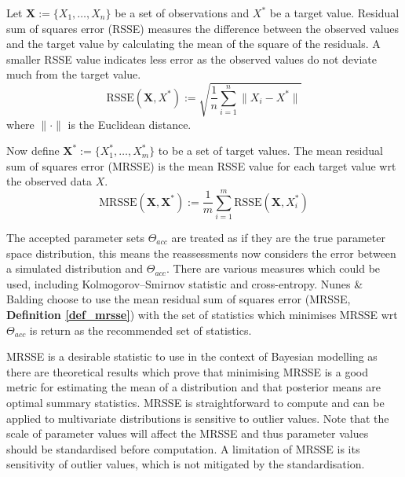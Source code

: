 \documentclass[11pt,a4paper]{article}
\theoremstyle{break}
\begin{document}
  \begin{box_definition}\label{def_mrsse}
    Let $\mathbf{X}:=\{X_1,\dots,X_n\}$ be a set of observations and $X^*$ be a target value. Residual sum of squares error (RSSE) measures the difference between the observed values and the target value by calculating the mean of the square of the residuals. A smaller RSSE value indicates less error as the observed values do not deviate much from the target value.
    \[ \text{RSSE}(\mathbf{X},X^*):=\sqrt{\frac1n\sum_{i=1}^n\|X_i-X^*\|} \]
    where $\|\cdot\|$ is the Euclidean distance.
    \par Now define $\mathbf{X}^*:=\{X_1^*,\dots,X_m^*\}$ to be a set of target values. The mean residual sum of squares error (MRSSE) is the mean RSSE value for each target value wrt the observed data $X$.
    \[ \text{MRSSE}(\mathbf{X},\mathbf{X}^*):=\frac1m\sum_{i=1}^m\text{RSSE}(\mathbf{X},X_i^*) \]
  \end{box_definition}

  \par The accepted parameter sets $\Theta_{acc}$ are treated as if they are the true parameter space distribution, this means the reassessments now considers the error between a simulated distribution and $\Theta_{acc}$. There are various measures which could be used, including Kolmogorov–Smirnov statistic \cite[]{kolmogorov_smirnov_statistics} and cross-entropy. Nunes \& Balding choose to use the mean residual sum of squares error (MRSSE, \textbf{Definition \ref{def_mrsse}}) with the set of statistics which minimises MRSSE wrt $\Theta_{acc}$ is return as the recommended set of statistics.

  \par MRSSE is a desirable statistic to use in the context of Bayesian modelling as there are theoretical results which prove that minimising MRSSE is a good metric for estimating the mean of a distribution and that posterior means are optimal summary statistics. %
  MRSSE is straightforward to compute and can be applied to multivariate distributions is sensitive to outlier values. Note that the scale of parameter values will affect the MRSSE and thus parameter values should be standardised before computation. A limitation of MRSSE is its sensitivity of outlier values, which is not mitigated by the standardisation.
\end{document}
